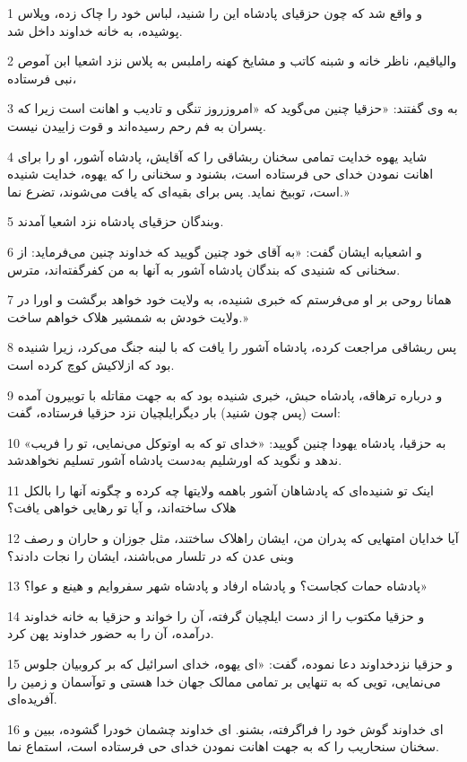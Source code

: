 \par 1 و واقع شد که چون حزقیای پادشاه این را شنید، لباس خود را چاک زده، وپلاس پوشیده، به خانه خداوند داخل شد.
\par 2 والیاقیم، ناظر خانه و شبنه کاتب و مشایخ کهنه راملبس به پلاس نزد اشعیا ابن آموص نبی فرستاده،
\par 3 به وی گفتند: «حزقیا چنین می‌گوید که «امروزروز تنگی و تادیب و اهانت است زیرا که پسران به فم رحم رسیده‌اند و قوت زاییدن نیست.
\par 4 شاید یهوه خدایت تمامی سخنان ربشاقی را که آقایش، پادشاه آشور، او را برای اهانت نمودن خدای حی فرستاده است، بشنود و سخنانی را که یهوه، خدایت شنیده است، توبیخ نماید. پس برای بقیه‌ای که یافت می‌شوند، تضرع نما.»
\par 5 وبندگان حزقیای پادشاه نزد اشعیا آمدند.
\par 6 و اشعیابه ایشان گفت: «به آقای خود چنین گویید که خداوند چنین می‌فرماید: از سخنانی که شنیدی که بندگان پادشاه آشور به آنها به من کفرگفته‌اند، مترس.
\par 7 همانا روحی بر او می‌فرستم که خبری شنیده، به ولایت خود خواهد برگشت و اورا در ولایت خودش به شمشیر هلاک خواهم ساخت.»
\par 8 پس ربشاقی مراجعت کرده، پادشاه آشور را یافت که با لبنه جنگ می‌کرد، زیرا شنیده بود که ازلاکیش کوچ کرده است.
\par 9 و درباره ترهاقه، پادشاه حبش، خبری شنیده بود که به جهت مقاتله با توبیرون آمده است (پس چون شنید) بار دیگرایلچیان نزد حزقیا فرستاده، گفت:
\par 10 «به حزقیا، پادشاه یهودا چنین گویید: «خدای تو که به اوتوکل می‌نمایی، تو را فریب ندهد و نگوید که اورشلیم به‌دست پادشاه آشور تسلیم نخواهدشد.
\par 11 اینک تو شنیده‌ای که پادشاهان آشور باهمه ولایتها چه کرده و چگونه آنها را بالکل هلاک ساخته‌اند، و آیا تو رهایی خواهی یافت؟
\par 12 آیا خدایان امتهایی که پدران من، ایشان راهلاک ساختند، مثل جوزان و حاران و رصف وبنی عدن که در تلسار می‌باشند، ایشان را نجات دادند؟
\par 13 پادشاه حمات کجاست؟ و پادشاه ارفاد و پادشاه شهر سفروایم و هینع و عوا؟»
\par 14 و حزقیا مکتوب را از دست ایلچیان گرفته، آن را خواند و حزقیا به خانه خداوند درآمده، آن را به حضور خداوند پهن کرد.
\par 15 و حزقیا نزدخداوند دعا نموده، گفت: «ای یهوه، خدای اسرائیل که بر کروبیان جلوس می‌نمایی، تویی که به تنهایی بر تمامی ممالک جهان خدا هستی و توآسمان و زمین را آفریده‌ای.
\par 16 ‌ای خداوند گوش خود را فرا‌گرفته، بشنو. ای خداوند چشمان خودرا گشوده، ببین و سخنان سنحاریب را که به جهت اهانت نمودن خدای حی فرستاده است، استماع نما.
